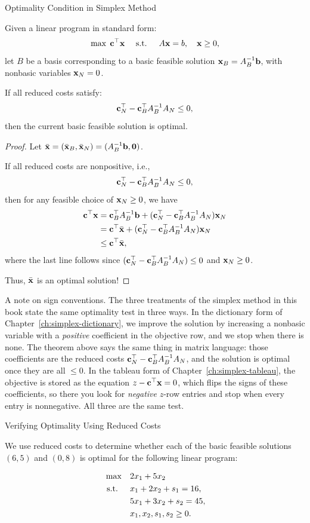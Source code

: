 \begin{theorem}{Optimality Condition in Simplex Method}{}

    Given a linear program in standard form:
    \[
    \max \; \mathbf{c}^\top \mathbf{x} \quad \text{ s.t. } \quad A \mathbf{x} = b, \quad \mathbf{x} \geq 0,
    \]
    let \(B\) be a basis corresponding to a basic feasible solution \( \mathbf{x}_B = A_B^{-1}\mathbf{b}\), with nonbasic variables \( \mathbf{x}_N = 0 \).

    If all reduced costs satisfy:
    \[
   \mathbf{c}_N^\top -\mathbf{c}_B^\top A_B^{-1} A_N \leq 0,
    \]
    then the current basic feasible solution is optimal.
\end{theorem}
\begin{proof}
Let $\bar {\mathbf{x}} = (\bar {\mathbf{x}}_B, \bar {\mathbf{x}}_N) = (A_B^{-1}\mathbf{b}, \mathbf{0})$.

    If all reduced costs are nonpositive, i.e.,
    \[
   \mathbf{c}_N^\top -\mathbf{c}_B^\top A_B^{-1} A_N \leq 0,
    \]
    then for any feasible choice of \( \mathbf{x}_N \geq 0 \), 
    we have
    \begin{align}
    \mathbf{c}^\top \mathbf{x} &= \mathbf{c}_B^\top A_B^{-1}\mathbf{b}+  (\mathbf{c}_N^\top -\mathbf{c}_B^\top A_B^{-1} A_N )\mathbf{x}_N\\
    &= \mathbf{c}^\top \bar {\mathbf{x}} +  (\mathbf{c}_N^\top -\mathbf{c}_B^\top A_B^{-1} A_N )\mathbf{x}_N\\
    & \leq \mathbf{c}^\top \bar {\mathbf{x}},
    \end{align}
    where the last line follows since $(\mathbf{c}_N^\top -\mathbf{c}_B^\top A_B^{-1} A_N ) \leq 0$ and $\mathbf{x}_N \geq 0$.
    
    Thus, $\bar {\mathbf{x}}$ is an optimal solution!
\end{proof}

\label{par:matrix-sign-conventions}%
A note on sign conventions.  The three treatments of the simplex method in this book state the same optimality test in three ways.  In the dictionary form of Chapter~\ref{ch:simplex-dictionary}, we improve the solution by increasing a nonbasic variable with a \emph{positive} coefficient in the objective row, and we stop when there is none.  The theorem above says the same thing in matrix language: those coefficients are the reduced costs $\mathbf{c}_N^\top -\mathbf{c}_B^\top A_B^{-1} A_N$, and the solution is optimal once they are all $\leq 0$.  In the tableau form of Chapter~\ref{ch:simplex-tableau}, the objective is stored as the equation $z - \mathbf{c}^\top\mathbf{x} = 0$, which flips the signs of these coefficients, so there you look for \emph{negative} $z$-row entries and stop when every entry is nonnegative.  All three are the same test.

\begin{example}{Verifying Optimality Using Reduced Costs}{}

We use reduced costs to determine whether each of the basic feasible solutions \( (6,5) \) and \( (0,8) \) is optimal for the following linear program:

\[
\begin{aligned}
    \max \quad & 2 x_1 + 5 x_2 \\
    \text{ s.t. } \quad 
    & x_1 + 2x_2 + s_1 = 16, \\
    & 5x_1 + 3x_2 + s_2 = 45, \\
    & x_1, x_2, s_1, s_2 \geq 0.
\end{aligned}
\]
\end{example}

